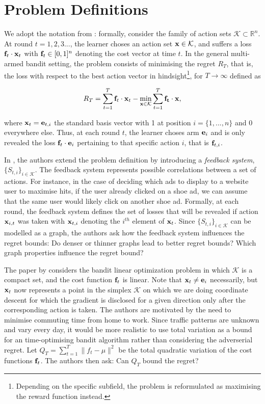 \section{Problem Definitions}
We adopt the notation from \citep{alon, hazan}: formally, consider the family of action sets $\mathcal{K}\subset \mathbb{R}^n$. At round $t=1,2,3...$, the learner choses an action set ${\bf x}\in \mathcal{K}$, and suffers a loss ${\bf f}_t\cdot{\bf x}_t$ with ${\bf f}_t\in [0,1]^n$ denoting the cost vector at time $t$. In the general multi-armed bandit setting, the problem consists of minimising the regret $R_T$, that is, the loss with respect to the best action vector in hindsight\footnote{Depending on the specific subfield, the problem is reformulated as maximising the reward function instead.}, for $T\to\infty$ defined as

\begin{align}
	R_T=\sum_{t=1}^T{\bf f}_t\cdot{\bf x}_t-\min_{{\bf x}\in \mathcal{K}}\sum_{t=1}^T {\bf f_t}\cdot{\bf x},
\end{align}

where ${\bf x}_t={\bf e}_{t,i}$ the standard basis vector with 1 at position $i=\{1,...,n\}$ and $0$ everywhere else. Thus, at each round $t$, the learner choses arm ${\bf e}_i$ and is only revealed the loss ${\bf f}_t\cdot{\bf e}_i$ pertaining to that specific action $i$, that is ${\bf f}_{t,i}$.  

In \citep{alon}, the authors extend the problem definition by introducing a \textit{feedback system}, $\{S_{t,i}\}_{i\in \mathcal{K}}$. The feedback system represents possible correlations between a set of actions. For instance, in the case of deciding which ads to display to a website user to maximise hits, if the user already clicked on a shoe ad, we can assume that the same user would likely click on another shoe ad. Formally, at each round, the feedback system defines the set of losses that will be revealed if action ${\bf x}_{i,t}$ was taken with ${\bf x}_{t,i}$ denoting the $i^{th}$ element of ${\bf x}_t$. Since $\{S_{t,i}\}_{i\in \mathcal{K}}$ can be modelled as a graph, the authors ask how the feedback system influences the regret bounds: Do denser or thinner graphs lead to better regret bounds? Which graph properties influence the regret bound? 

The paper by \citep{hazan} considers the bandit linear optimization problem in which $\mathcal{K}$ is a compact set, and the cost function ${\bf f}_t$ is linear. Note that ${\bf x}_t\not={\bf e}_i$ necessarily, but ${\bf x}_t$ now represents a point in the simplex $\mathcal{K}$ on which we are doing coordinate descent for which the gradient is disclosed for a given direction only after the corresponding action is taken. The authors are motivated by the need to minimise commuting time from home to work. Since traffic patterns are unknown and vary every day, it would be more realistic to use total variation as a bound for an time-optimising bandit algorithm rather than considering the adverserial regret. Let $Q_T=\sum_{t=1}^T \| f_t - \mu \|^2$ be the total quadratic variation of the cost functions ${\bf f}_t$. The authors then ask: Can $Q_T$ bound the regret?

